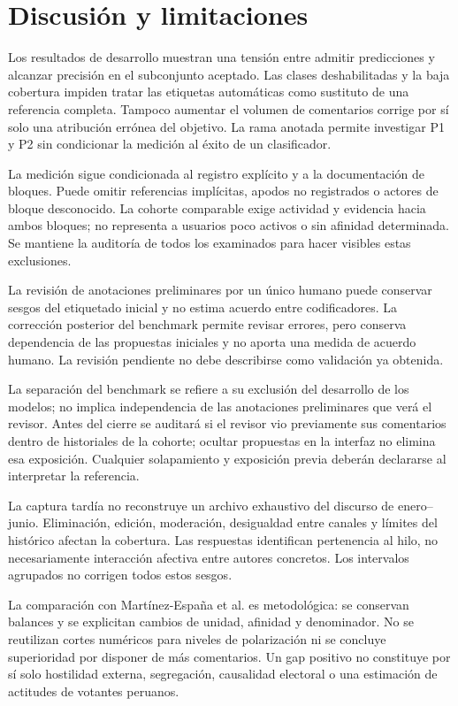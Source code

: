\documentclass[conference,letterpaper]{IEEEtran}
\begin{document}
\section{Discusión y limitaciones}
Los resultados de desarrollo muestran una tensión entre admitir predicciones y alcanzar precisión en el subconjunto aceptado. Las clases deshabilitadas y la baja cobertura impiden tratar las etiquetas automáticas como sustituto de una referencia completa. Tampoco aumentar el volumen de comentarios corrige por sí solo una atribución errónea del objetivo. La rama anotada permite investigar P1 y P2 sin condicionar la medición al éxito de un clasificador.

La medición sigue condicionada al registro explícito y a la documentación de bloques. Puede omitir referencias implícitas, apodos no registrados o actores de bloque desconocido. La cohorte comparable exige actividad y evidencia hacia ambos bloques; no representa a usuarios poco activos o sin afinidad determinada. Se mantiene la auditoría de todos los examinados para hacer visibles estas exclusiones.

La revisión de anotaciones preliminares por un único humano puede conservar sesgos del etiquetado inicial y no estima acuerdo entre codificadores. La corrección posterior del benchmark permite revisar errores, pero conserva dependencia de las propuestas iniciales y no aporta una medida de acuerdo humano. La revisión pendiente no debe describirse como validación ya obtenida.

La separación del benchmark se refiere a su exclusión del desarrollo de los modelos; no implica independencia de las anotaciones preliminares que verá el revisor. Antes del cierre se auditará si el revisor vio previamente sus comentarios dentro de historiales de la cohorte; ocultar propuestas en la interfaz no elimina esa exposición. Cualquier solapamiento y exposición previa deberán declararse al interpretar la referencia.

La captura tardía no reconstruye un archivo exhaustivo del discurso de enero--junio. Eliminación, edición, moderación, desigualdad entre canales y límites del histórico afectan la cobertura. Las respuestas identifican pertenencia al hilo, no necesariamente interacción afectiva entre autores concretos. Los intervalos agrupados no corrigen todos estos sesgos.

La comparación con Martínez-España et al. es metodológica: se conservan balances y se explicitan cambios de unidad, afinidad y denominador. No se reutilizan cortes numéricos para niveles de polarización ni se concluye superioridad por disponer de más comentarios. Un gap positivo no constituye por sí solo hostilidad externa, segregación, causalidad electoral o una estimación de actitudes de votantes peruanos.
\end{document}
